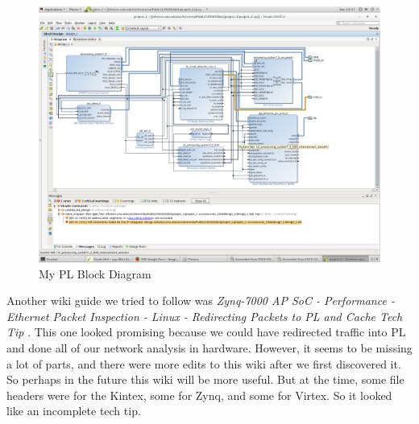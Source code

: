 \documentclass[12pt]{report}
\begin{document}
\begin{figure}[H]
\centering
\includegraphics[width=6in]{my_design}
\caption{My PL Block Diagram}
\label{fig:my_design}
\end{figure}

Another wiki guide we tried to follow was \textit{Zynq-7000 AP SoC - Performance - Ethernet Packet Inspection - Linux - Redirecting Packets to PL and Cache Tech Tip} \cite{redirect}. This one looked promising because we could have redirected traffic into PL and done all of our network analysis in hardware. However, it seems to be missing a lot of parts, and there were more edits to this wiki after we first discovered it. So perhaps in the future this wiki will be more useful. But at the time, some file headers were for the Kintex, some for Zynq, and some for Virtex. So it looked like an incomplete tech tip.
\end{document}
